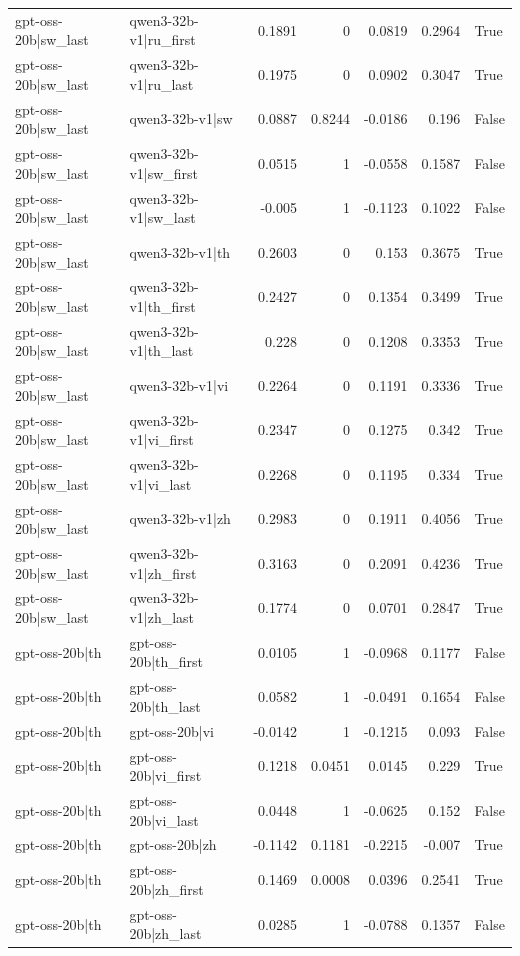 \begin{table}
\begin{tabular}{l l r r r r l}
gpt-oss-20b|sw_last & qwen3-32b-v1|ru_first & 0.1891 & 0 & 0.0819 & 0.2964 & True \\
gpt-oss-20b|sw_last & qwen3-32b-v1|ru_last & 0.1975 & 0 & 0.0902 & 0.3047 & True \\
gpt-oss-20b|sw_last & qwen3-32b-v1|sw & 0.0887 & 0.8244 & -0.0186 & 0.196 & False \\
gpt-oss-20b|sw_last & qwen3-32b-v1|sw_first & 0.0515 & 1 & -0.0558 & 0.1587 & False \\
gpt-oss-20b|sw_last & qwen3-32b-v1|sw_last & -0.005 & 1 & -0.1123 & 0.1022 & False \\
gpt-oss-20b|sw_last & qwen3-32b-v1|th & 0.2603 & 0 & 0.153 & 0.3675 & True \\
gpt-oss-20b|sw_last & qwen3-32b-v1|th_first & 0.2427 & 0 & 0.1354 & 0.3499 & True \\
gpt-oss-20b|sw_last & qwen3-32b-v1|th_last & 0.228 & 0 & 0.1208 & 0.3353 & True \\
gpt-oss-20b|sw_last & qwen3-32b-v1|vi & 0.2264 & 0 & 0.1191 & 0.3336 & True \\
gpt-oss-20b|sw_last & qwen3-32b-v1|vi_first & 0.2347 & 0 & 0.1275 & 0.342 & True \\
gpt-oss-20b|sw_last & qwen3-32b-v1|vi_last & 0.2268 & 0 & 0.1195 & 0.334 & True \\
gpt-oss-20b|sw_last & qwen3-32b-v1|zh & 0.2983 & 0 & 0.1911 & 0.4056 & True \\
gpt-oss-20b|sw_last & qwen3-32b-v1|zh_first & 0.3163 & 0 & 0.2091 & 0.4236 & True \\
gpt-oss-20b|sw_last & qwen3-32b-v1|zh_last & 0.1774 & 0 & 0.0701 & 0.2847 & True \\
gpt-oss-20b|th & gpt-oss-20b|th_first & 0.0105 & 1 & -0.0968 & 0.1177 & False \\
gpt-oss-20b|th & gpt-oss-20b|th_last & 0.0582 & 1 & -0.0491 & 0.1654 & False \\
gpt-oss-20b|th & gpt-oss-20b|vi & -0.0142 & 1 & -0.1215 & 0.093 & False \\
gpt-oss-20b|th & gpt-oss-20b|vi_first & 0.1218 & 0.0451 & 0.0145 & 0.229 & True \\
gpt-oss-20b|th & gpt-oss-20b|vi_last & 0.0448 & 1 & -0.0625 & 0.152 & False \\
gpt-oss-20b|th & gpt-oss-20b|zh & -0.1142 & 0.1181 & -0.2215 & -0.007 & True \\
gpt-oss-20b|th & gpt-oss-20b|zh_first & 0.1469 & 0.0008 & 0.0396 & 0.2541 & True \\
gpt-oss-20b|th & gpt-oss-20b|zh_last & 0.0285 & 1 & -0.0788 & 0.1357 & False \\

\end{tabular}
\end{table}
